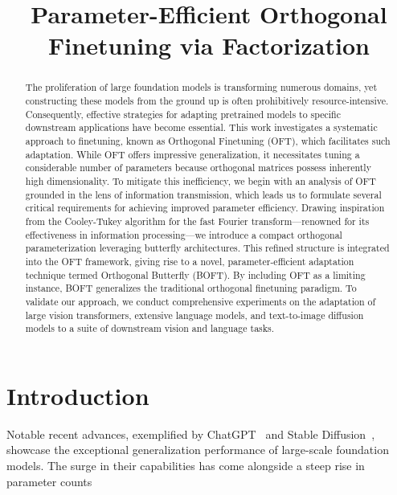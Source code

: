\title{Parameter-Efficient Orthogonal Finetuning via Factorization}

\begin{abstract}
The proliferation of large foundation models is transforming numerous domains, yet constructing these models from the ground up is often prohibitively resource-intensive. Consequently, effective strategies for adapting pretrained models to specific downstream applications have become essential. This work investigates a systematic approach to finetuning, known as Orthogonal Finetuning (OFT), which facilitates such adaptation. While OFT offers impressive generalization, it necessitates tuning a considerable number of parameters because orthogonal matrices possess inherently high dimensionality. To mitigate this inefficiency, we begin with an analysis of OFT grounded in the lens of information transmission, which leads us to formulate several critical requirements for achieving improved parameter efficiency. Drawing inspiration from the Cooley-Tukey algorithm for the fast Fourier transform—renowned for its effectiveness in information processing—we introduce a compact orthogonal parameterization leveraging butterfly architectures. This refined structure is integrated into the OFT framework, giving rise to a novel, parameter-efficient adaptation technique termed Orthogonal Butterfly (BOFT). By including OFT as a limiting instance, BOFT generalizes the traditional orthogonal finetuning paradigm. To validate our approach, we conduct comprehensive experiments on the adaptation of large vision transformers, extensive language models, and text-to-image diffusion models to a suite of downstream vision and language tasks.
\end{abstract}

\section{Introduction}

Notable recent advances, exemplified by ChatGPT~\cite{brown2020language,chen2021evaluating} and Stable Diffusion~\cite{rombach2022high}, showcase the exceptional generalization performance of large-scale foundation models. The surge in their capabilities has come alongside a steep rise in parameter counts

